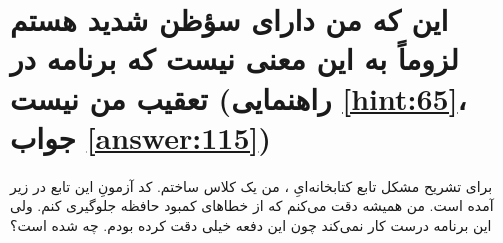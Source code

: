 \section[این که من دارای سؤظن شدید هستم لزوماً به این معنی نیست که برنامه در تعقیب من نیست]{این که من دارای سؤظن شدید هستم لزوماً به این معنی نیست که برنامه در تعقیب من نیست \protect{} (راهنمایی \ref{hint:65}، جواب \ref{answer:115})}
\paragraph{}\label{prog:89}
برای تشریح مشکل تابع کتابخانه‌ایِ ، من یک کلاس  ساختم. کد آزمونِ این تابع در زیر آمده است. من همیشه دقت می‌کنم که از خطاهای کمبود حافظه جلوگیری کنم. ولی این برنامه درست کار نمی‌کند چون این دفعه خیلی دقت کرده بودم. چه شده است؟

